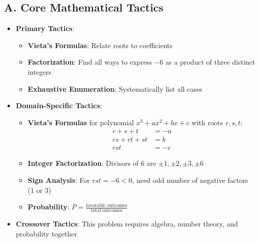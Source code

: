 \documentclass[12pt]{article}
\begin{document}
\begin{tacticalbox}
\subsection*{A. Core Mathematical Tactics}
\begin{itemize}[leftmargin=*]
    \item \textbf{Primary Tactics}: 
    \begin{itemize}
        \item \textbf{Vieta's Formulas}: Relate roots to coefficients
        \item \textbf{Factorization}: Find all ways to express $-6$ as a product of three distinct integers
        \item \textbf{Exhaustive Enumeration}: Systematically list all cases
    \end{itemize}
    
    \item \textbf{Domain-Specific Tactics}:
    \begin{itemize}
        \item \textbf{Vieta's Formulas} for polynomial $x^3 + ax^2 + bx + c$ with roots $r, s, t$:
        \begin{align*}
            r + s + t &= -a \\
            rs + rt + st &= b \\
            rst &= -c
        \end{align*}
        
        \item \textbf{Integer Factorization}: Divisors of 6 are $\pm 1, \pm 2, \pm 3, \pm 6$
        
        \item \textbf{Sign Analysis}: For $rst = -6 < 0$, need odd number of negative factors (1 or 3)
        
        \item \textbf{Probability}: $P = \frac{\text{favorable outcomes}}{\text{total outcomes}}$
    \end{itemize}
    
    \item \textbf{Crossover Tactics}: This problem requires algebra, number theory, and probability together
\end{itemize}
\end{tacticalbox}
\end{document}
